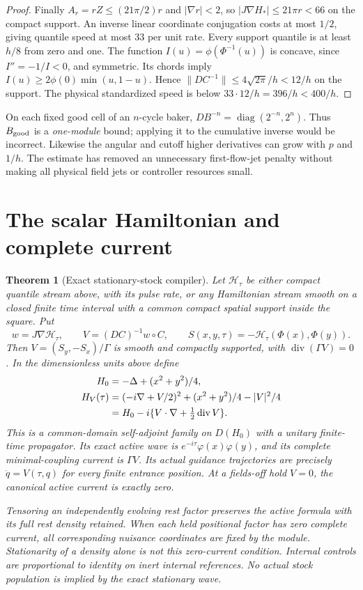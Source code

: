 \documentclass[11pt]{article}
\numberwithin{equation}{section}
\newtheorem{theorem}{Theorem}[section]
\theoremstyle{definition}
\theoremstyle{remark}
\begin{document}
\begin{proof}
Finally $A_r=rZ\leq(21\pi/2)r$ and $|\nabla r|<2$,
so $|J\nabla H_*|\leq21\pi r<66$ on the compact support.
An inverse linear coordinate conjugation costs at most
$1/2$, giving quantile speed at most $33$ per unit rate.
Every support quantile is at least $h/8$ from zero and one.
The function $I(u)=\phi(\Phi^{-1}(u))$ is concave,
since $I''=-1/I<0$, and symmetric. Its chords imply
$I(u)\geq2\phi(0)\min(u,1-u)$. Hence
$\|DC^{-1}\|\leq4\sqrt{2\pi}/h<12/h$ on the support.
The physical standardized speed is below
$33\cdot12/h=396/h<400/h$.
\end{proof}

On each fixed good cell of an $n$-cycle baker,
$DB^{-n}=\operatorname{diag}(2^{-n},2^n)$.
Thus $B_{\rm good}$ is a \emph{one-module} bound; applying
it to the cumulative inverse would be incorrect. Likewise
the angular and cutoff higher derivatives can grow with
$p$ and $1/h$. The estimate has removed an unnecessary
first-flow-jet penalty without making all physical field
jets or controller resources small.

\section{The scalar Hamiltonian and complete current}
\label{p2c:sec:compiler}

\begin{theorem}[Exact stationary-stock compiler]
\label{p2c:thm:compiler}
Let $\mathcal H_\tau$ be either compact quantile stream
above, with its pulse rate, or any Hamiltonian stream
smooth on a closed finite time interval with a common
compact spatial support inside the square. Put
\[
 w=J\nabla\mathcal H_\tau,\qquad
 V=(DC)^{-1}w\circ C,\qquad
 S(x,y,\tau)=-\mathcal H_\tau(\Phi(x),\Phi(y)).
\]
Then $V=(S_y,-S_x)/\Gamma$ is smooth and compactly
supported, with $\operatorname{div}(\Gamma V)=0$.
In the dimensionless units above define
\begin{align}
 H_0&=-\Delta+(x^2+y^2)/4,\notag\\
 H_V(\tau)&=(-i\nabla+V/2)^2+(x^2+y^2)/4-|V|^2/4
 \notag\\
 &=H_0-i\{V\cdot\nabla+\tfrac12\operatorname{div}V\}.
 \label{p2c:eq:compiler}
\end{align}
This is a common-domain self-adjoint family on $D(H_0)$
with a unitary finite-time propagator. Its exact active
wave is
$e^{-i\tau}\varphi(x)\varphi(y)$, and its complete
minimal-coupling current is $\Gamma V$.
Its actual guidance trajectories are precisely
$\dot q=V(\tau,q)$ for every finite entrance position.
At a fields-off hold $V=0$, the canonical active
current is exactly zero.

Tensoring an independently evolving rest factor preserves
the active formula with its full rest density retained.
When each held positional factor has zero complete current, all
corresponding nuisance coordinates are fixed by the module. Stationarity
of a density alone is not this zero-current condition. Internal controls
are proportional to identity on inert internal
references. No actual stock population is implied by
the exact stationary wave.
\end{theorem}
\end{document}
